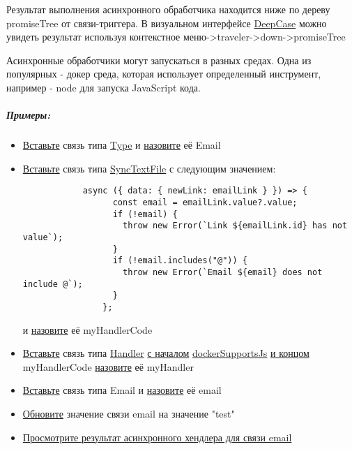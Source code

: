 \hypertarget{Handlers.Async.HowToGetResult}{}Результат выполнения асинхронного
обработчика находится ниже по дереву
promiseTree от связи-триггера. В визуальном интерфейсе
\hyperlink{DeepCase.Description}{DeepCase} можно увидеть
результат используя контекстное меню->traveler->down->promiseTree

Асинхронные обработчики могут запускаться в разных средах. Одна из популярных -
докер среда, которая использует определенный инструмент, например - node для
запуска JavaScript кода.
\subparagraph{Примеры:}
\begin{itemize}
      \item \hyperlink{DeepCase.InsertLink.Description}{Вставьте} связь типа
            \hyperlink{Core.Type.Description}{Type} и
            \hyperlink{FAQ.HowToSetName}{назовите} её Email
      \item \hyperlink{DeepCase.InsertLink.Description}{Вставьте} связь типа
            \hyperlink{Core.SyncTextFile.Description}{SyncTextFile} с следующим
            значением:
            \begin{lstlisting}
            async ({ data: { newLink: emailLink } }) => {
                  const email = emailLink.value?.value;
                  if (!email) {
                    throw new Error(`Link ${emailLink.id} has not value`);
                  }
                  if (!email.includes("@")) {
                    throw new Error(`Email ${email} does not include @`);
                  }
                };
            \end{lstlisting}
            и \hyperlink{FAQ.HowToSetName}{назовите} её myHandlerCode
      \item \hyperlink{DeepCase.InsertLink.Description}{Вставьте} связь типа
            \hyperlink{Core.Handler.Description}{Handler}
            \hyperlink{FAQ.HowToInsertLinkWithFromAndTo}{с началом}
            \hyperlink{Core.dockerSupportsJs.Description}{dockerSupportsJs}
            \hyperlink{FAQ.HowToInsertLinkWithFromAndTo}{и
                  концом}
            myHandlerCode \hyperlink{FAQ.HowToSetName}{назовите} её myHandler
      \item \hyperlink{DeepCase.InsertLink.Description}{Вставьте} связь типа
            Email и \hyperlink{FAQ.HowToSetName}{назовите} её email
      \item \hyperlink{DeepCase.UpdateLink.Description}{Обновите} значение
            связи email на значение "test"
      \item \hyperlink{Handlers.Async.HowToGetResult}{Просмотрите результат
                  асинхронного хендлера для связи email}

\end{itemize}
